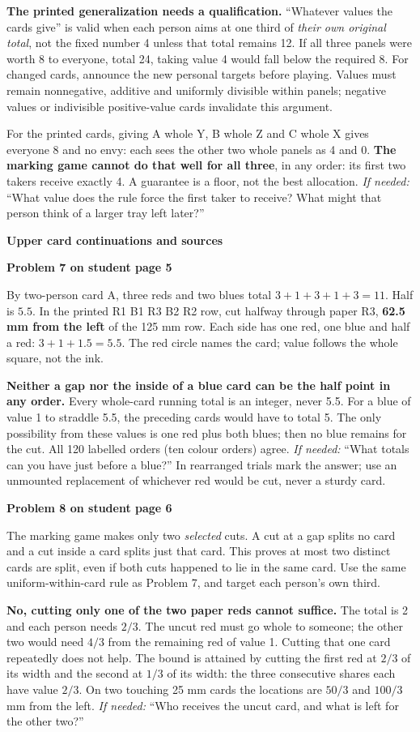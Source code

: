 \documentclass[11pt]{article}
\newcommand{\head}[1]{\par\textbf{\large #1}\par}
\newcommand{\sub}[1]{\par\textbf{#1}\par}
\newcommand{\hint}[1]{\textit{If needed:} #1}
\begin{document}
\textbf{The printed generalization needs a qualification.} ``Whatever values the cards give'' is valid when each person aims at one third of \emph{their own original total}, not the fixed number 4 unless that total remains 12. If all three panels were worth 8 to everyone, total 24, taking value 4 would fall below the required 8. For changed cards, announce the new personal targets before playing. Values must remain nonnegative, additive and uniformly divisible within panels; negative values or indivisible positive-value cards invalidate this argument.

For the printed cards, giving A whole Y, B whole Z and C whole X gives everyone 8 and no envy: each sees the other two whole panels as 4 and 0. \textbf{The marking game cannot do that well for all three}, in any order: its first two takers receive exactly 4. A guarantee is a floor, not the best allocation. \hint{``What value does the rule force the first taker to receive? What might that person think of a larger tray left later?''}
\newpage
\head{Upper card continuations and sources}
\sub{Problem 7 on student page 5}
By two-person card A, three reds and two blues total $3+1+3+1+3=11$. Half is $5.5$. In the printed R1 B1 R3 B2 R2 row, cut halfway through paper R3, \textbf{62.5 mm from the left} of the 125 mm row. Each side has one red, one blue and half a red: $3+1+1.5=5.5$. The red circle names the card; value follows the whole square, not the ink.

\textbf{Neither a gap nor the inside of a blue card can be the half point in any order.} Every whole-card running total is an integer, never 5.5. For a blue of value 1 to straddle 5.5, the preceding cards would have to total 5. The only possibility from these values is one red plus both blues; then no blue remains for the cut. All 120 labelled orders (ten colour orders) agree. \hint{``What totals can you have just before a blue?''} In rearranged trials mark the answer; use an unmounted replacement of whichever red would be cut, never a sturdy card.

\sub{Problem 8 on student page 6}
The marking game makes only two \emph{selected} cuts. A cut at a gap splits no card and a cut inside a card splits just that card. This proves at most two distinct cards are split, even if both cuts happened to lie in the same card. Use the same uniform-within-card rule as Problem 7, and target each person's own third.

\textbf{No, cutting only one of the two paper reds cannot suffice.} The total is 2 and each person needs $2/3$. The uncut red must go whole to someone; the other two would need $4/3$ from the remaining red of value 1. Cutting that one card repeatedly does not help. The bound is attained by cutting the first red at $2/3$ of its width and the second at $1/3$ of its width: the three consecutive shares each have value $2/3$. On two touching 25 mm cards the locations are $50/3$ and $100/3$ mm from the left. \hint{``Who receives the uncut card, and what is left for the other two?''}
\end{document}
